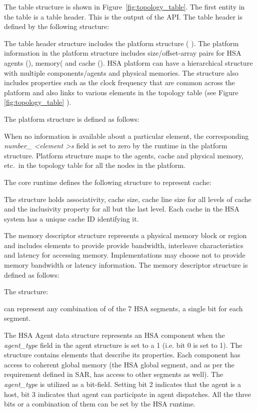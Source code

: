 The table structure is shown in Figure~\ref{fig:topology_table}.
The first entity in the table is a table header. This is the output
of the  API.
The table header is defined by the following structure:


The table header structure includes the platform structure (
).  The platform information in the platform
structure includes size/offset-array pairs for HSA agents
(), memory( and
cache ().  
HSA platform can have a hierarchical structure with multiple
components/agents and physical memories.  The
 structure also includes properties such as
the clock frequency that are common across the platform and also
links to various elements in the topology table (see Figure
\ref{fig:topology_table} ).

The platform structure is defined as follows:



When no information is available about a particular element, the
corresponding {\itshape number\_ \textless element \textgreater s}
field is set to zero by the runtime in the platform structure.
Platform structure maps to the agents, cache and physical memory,
etc.\, in the topology table for all the nodes in the platform. 

The core runtime defines the following structure to represent cache:

The structure holds associativity, cache size, cache line size for
all levels of cache and the inclusivity property for all but the
last level. Each cache in the HSA system has a unique cache ID
identifying it. 

The memory descriptor structure represents a physical memory block
or region and includes elements to provide provide bandwidth, interleave
characteristics and latency for accessing memory. Implementations
may choose not to provide memory bandwidth or latency information.
The memory descriptor structure is defined as follows:

 

The structure: 
 
can represent any combination of of the 7 HSA segments, a single
bit for each segment. 

The HSA Agent data structure represents an HSA component when the
{\itshape agent\_type} field in the agent structure is set to a 1
(i.e. bit 0 is set to 1).
The structure contains elements that describe its properties. Each
component has access to coherent global memory (the HSA global
segment, and as per the requirement defined in SAR, has access to
other segments as well). The {\itshape agent\_type} is utilized as a
bit-field. Setting bit 2 indicates that the agent is a host, bit 3
indicates that agent can participate in agent dispatches. All the
three bits or a combination of them can be set by the HSA runtime.

